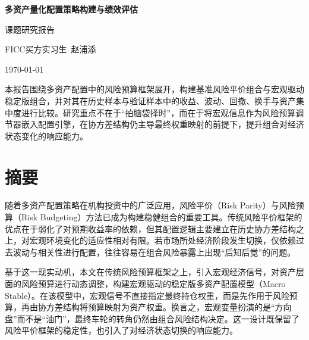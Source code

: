 \documentclass[12pt,a4paper]{ctexart}
\begin{document}
\begin{titlepage}
    \centering
    \vspace*{2.2cm}

    {\bfseries 多资产量化配置策略构建与绩效评估\par}
    \vspace{1.2cm}

    {课题研究报告\par}
    \vspace{0.8cm}

    {\large FICC买方实习生\ 赵浦添\par}
    \vspace{0.5cm}
    {\large \today\par}

    \vfill

    \begin{minipage}{0.86\textwidth}
    本报告围绕多资产配置中的风险预算框架展开，构建基准风险平价组合与宏观驱动稳定版组合，并对其在历史样本与验证样本中的收益、波动、回撤、换手与资产集中度进行比较。研究重点不在于“拍脑袋择时”，而在于将宏观信息作为风险预算调节器嵌入配置引擎，在协方差结构仍主导最终权重映射的前提下，提升组合对经济状态变化的响应能力。
    \end{minipage}

    \vfill
\end{titlepage}

\tableofcontents
\newpage

\section{摘要}

随着多资产配置策略在机构投资中的广泛应用，风险平价（Risk Parity）与风险预算（Risk Budgeting）方法已成为构建稳健组合的重要工具。传统风险平价框架的优点在于弱化了对预期收益率的依赖，但其配置逻辑主要建立在历史协方差结构之上，对宏观环境变化的适应性相对有限。若市场所处经济阶段发生切换，仅依赖过去波动与相关性进行配置，往往容易在组合风险暴露上出现“后知后觉”的问题。

基于这一现实动机，本文在传统风险预算框架之上，引入宏观经济信号，对资产层面的风险预算进行动态调整，构建宏观驱动的稳定版多资产配置模型（Macro Stable）。在该模型中，宏观信号不直接指定最终持仓权重，而是先作用于风险预算，再由协方差结构将预算映射为资产权重。换言之，宏观变量扮演的是“方向盘”而不是“油门”，最终车轮的转角仍然由组合风险结构决定。这一设计既保留了风险平价框架的稳定性，也引入了对经济状态切换的响应能力。
\end{document}
